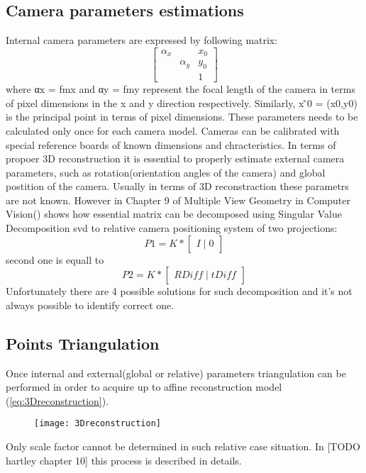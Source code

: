 \subsection{Camera parameters estimations}
Internal camera parameters are expressed by following matrix:
\begin{equation}
\begin{bmatrix}
\alpha _{x} &  & x_{0} \\ 
 & \alpha _{y} & y_{0}\\ 
 &  & 1
\end{bmatrix}
\end{equation}
where αx = fmx and αy = fmy represent the focal length of the camera in terms of pixel dimensions in the x and y direction respectively. Similarly, x ̃0 = (x0,y0) is the principal point in terms of pixel dimensions. These parameters needs to be calculated only once for each camera model. Cameras can be calibrated with special reference boards of known dimensions and chracteristics.
In terms of propoer 3D reconstruction it is essential to properly estimate external camera parameters, such as rotation(orientation angles of the camera) and global postition of the camera. Usually in terms of 3D reconstraction these parametrs are not known. However in Chapter 9 of Multiple View Geometry in Computer Vision(\cite{HartleyMultipleView}) shows how essential matrix can be decomposed using Singular Value Decomposition \gls{svd} to relative camera positioning system of two projections:
\begin{equation}
 P1 = K * \begin{bmatrix}I\mid 0\end{bmatrix}
\end{equation}
second one is equall to 
\begin{equation}
 P2 = K * \begin{bmatrix}RDiff\mid tDiff\end{bmatrix}
\end{equation}
Unfortunately there are 4 possible solutions for such decomposition and it's not always possible to identify correct one.
\subsection{Points Triangulation}
Once internal and external(global or relative) parameters triangulation can be performed in order to acquire up to affine reconstruction model (\ref{eq:3Dreconstruction}).
\begin{figure}[p]
    \centering
    \texttt{[image: 3Dreconstruction]}
    \caption{}
    \label{fig:3Dreconstruction}
\end{figure}
Only scale factor cannot be determined in such relative case situation. In [TODO hartley chapter 10] this process is described in details.
